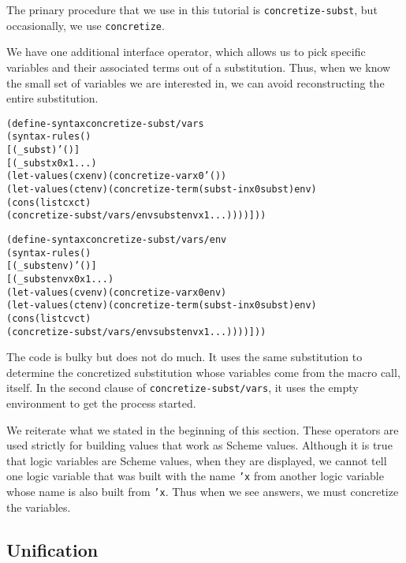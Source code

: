 The prinary procedure that we use in this tutorial is
\texttt{concretize-subst}, but occasionally, we use
\texttt{concretize}.

We have one additional interface operator, which allows us to pick
specific variables and their associated terms out of a substitution.
Thus, when we know the small set of variables we are interested in, we
can avoid reconstructing the entire substitution.

\begin{alltt}
(define-syntax concretize-subst/vars
  (syntax-rules ()
    [(_ subst) '()]
    [(_ subst x0 x1 ...)
     (let-values (cx env) (concretize-var x0 '())
       (let-values (ct env) (concretize-term (subst-in x0 subst) env)
         (cons (list cx ct)
           (concretize-subst/vars/env subst env x1 ...))))]))

(define-syntax concretize-subst/vars/env
  (syntax-rules ()
    [(_ subst env) '()]
    [(_ subst env x0 x1 ...)
     (let-values (cv env) (concretize-var x0 env)
       (let-values (ct env) (concretize-term (subst-in x0 subst) env)
         (cons (list cv ct)
           (concretize-subst/vars/env subst env x1 ...))))]))
\end{alltt}

The code is bulky but does not do much.  It uses the same substitution
to determine the concretized substitution whose variables come from
the macro call, itself.  In the second clause of
\texttt{concretize-subst/vars}, it uses the empty environment to get
the process started.

We reiterate what we stated in the beginning of this section.  These
operators are used strictly for building values that work as Scheme
values.  Although it is true that logic variables are Scheme values,
when they are displayed, we cannot tell one logic variable that was
built with the name \texttt{'x} from another logic variable whose
name is also built from \texttt{'x}.  Thus when we see answers, we
must concretize the variables.

\subsection{Unification}


